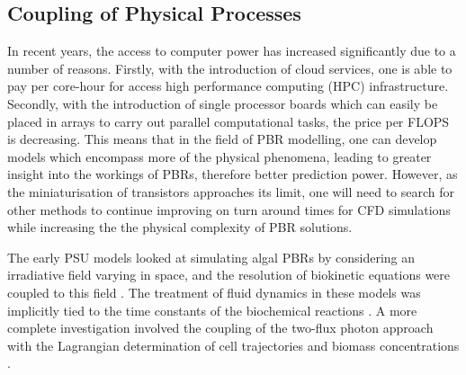 
\subsection{Coupling of Physical Processes}
\label{S:2.6}
In recent years, the access to computer power has increased significantly due to a number of reasons. Firstly, with the introduction of cloud services, one is able to pay per core-hour for access high performance computing (HPC) infrastructure. Secondly, with the introduction of single processor boards which can easily be placed in arrays to carry out parallel computational tasks, the price per FLOPS is decreasing. This means that in the field of PBR modelling, one can develop models which encompass more of the physical phenomena, leading to greater insight into the workings of PBRs, therefore better prediction power. However, as the miniaturisation of transistors approaches its limit, one will need to search for other methods to continue improving on turn around times for CFD simulations while increasing the the physical complexity of PBR solutions. 

\skippingparagraph
The early PSU models looked at simulating algal PBRs by considering an irradiative field varying in space, and the resolution of biokinetic equations were coupled to this field \cite{wu2001,wu2002,merchuk2003,merchuk2007}. The treatment of fluid dynamics in these models was implicitly tied to the time constants of the biochemical reactions \cite{merchuk2007}. A more complete investigation involved the coupling of the two-flux photon approach with the Lagrangian determination of cell trajectories and biomass concentrations \cite{pruvost2008}.



